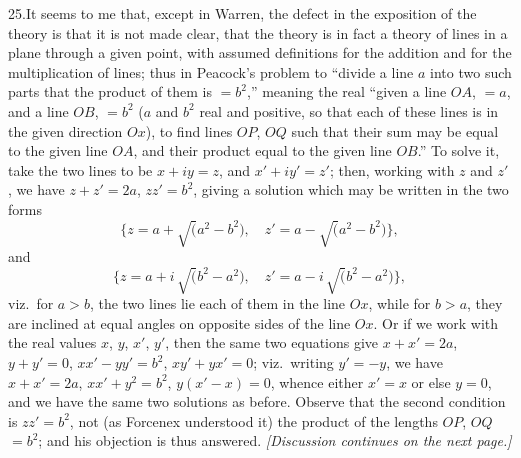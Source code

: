 \documentclass[11pt]{article}
\begin{document}
25.\quad It seems to me that, except in Warren, the defect in the exposition of the theory is that it is not made clear, that the theory is in fact a theory of lines in a plane through a given point, with assumed definitions for the addition and for the multiplication of lines; thus in Peacock's problem to ``divide a line $a$ into two such parts that the product of them is $= b^{2}$,'' meaning the real ``given a line $OA$, $= a$, and a line $OB$, $= b^{2}$ ($a$ and $b^{2}$ real and positive, so that each of these lines is in the given direction $Ox$), to find lines $OP$, $OQ$ such that their sum may be equal to the given line $OA$, and their product equal to the given line $OB$.''  To solve it, take the two lines to be $x + iy = z$, and $x' + iy' = z'$; then, working with $z$ and $z'$, we have $z + z' = 2a$, $zz' = b^{2}$, giving a solution which may be written in the two forms
\[
\{z = a + \surd(a^{2} - b^{2}),\quad z' = a - \surd(a^{2} - b^{2})\},
\]
and
\[
\{z = a + i\,\surd(b^{2} - a^{2}),\quad z' = a - i\,\surd(b^{2} - a^{2})\},
\]
viz.\ for $a > b$, the two lines lie each of them in the line $Ox$, while for $b > a$, they are inclined at equal angles on opposite sides of the line $Ox$. Or if we work with the real values $x$, $y$, $x'$, $y'$, then the same two equations give $x + x' = 2a$, $y + y' = 0$, $xx' - yy' = b^{2}$, $xy' + yx' = 0$; viz.\ writing $y' = -y$, we have $x + x' = 2a$, $xx' + y^{2} = b^{2}$, $y(x' - x) = 0$, whence either $x' = x$ or else $y = 0$, and we have the same two solutions as before. Observe that the second condition is $zz' = b^{2}$, not (as Forcenex understood it) the product of the lengths $OP$, $OQ$ $= b^{2}$; and his objection is thus answered. \textit{[Discussion continues on the next page.]}

\vfill
\end{document}
